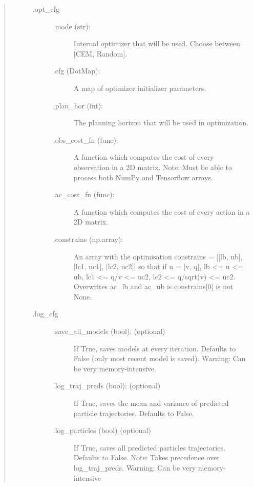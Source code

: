 \documentclass[letterpaper,10pt,english,openany,oneside]{sphinxmanual}
\begin{document}
\begin{fulllineitems}
\begin{quote}
\begin{description}
\begin{description}
\begin{description}
\end{description}

\item[{.opt\_cfg}] \leavevmode\begin{description}
\item[{.mode (str):}] \leavevmode
Internal optimizer that will be used. Choose between {[}CEM, Random{]}.

\item[{.cfg (DotMap):}] \leavevmode
A map of optimizer initializer parameters.

\item[{.plan\_hor (int):}] \leavevmode
The planning horizon that will be used in optimization.

\item[{.obs\_cost\_fn (func):}] \leavevmode
A function which computes the cost of every observation in a 2D matrix.
Note: Must be able to process both NumPy and Tensorflow arrays.

\item[{.ac\_cost\_fn (func):}] \leavevmode
A function which computes the cost of every action in a 2D matrix.

\item[{.constrains (np.array):}] \leavevmode
An array with the optimisation constrains = {[}{[}lb, ub{]}, {[}lc1, uc1{]}, {[}lc2, uc2{]}{]}
so that if u = {[}v, q{]}, lb \textless{}= u \textless{}= ub, lc1 \textless{}= q/v \textless{}= uc2, lc2 \textless{}= q/sqrt(v) \textless{}= uc2.
Overwrites ac\_lb and ac\_ub is constrains{[}0{]} is not None.

\end{description}

\item[{.log\_cfg}] \leavevmode\begin{description}
\item[{.save\_all\_models (bool): (optional)}] \leavevmode
If True, saves models at every iteration.
Defaults to False (only most recent model is saved).
Warning: Can be very memory-intensive.

\item[{.log\_traj\_preds (bool): (optional)}] \leavevmode
If True, saves the mean and variance of predicted particle trajectories.
Defaults to False.

\item[{.log\_particles (bool) (optional)}] \leavevmode
If True, saves all predicted particles trajectories.
Defaults to False. Note: Takes precedence over log\_traj\_preds.
Warning: Can be very memory-intensive


\end{description}
\end{description}
\end{description}
\end{quote}
\end{fulllineitems}
\end{document}
